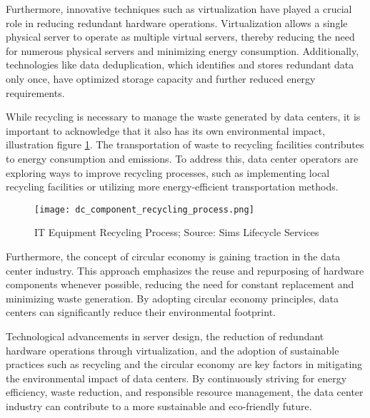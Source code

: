 \documentclass[
  a4paper,  %
  twoside,  %
  bibliography=totoc,
  headsepline,
  cleardoublepage=empty,
  parskip=half,
  draft=false
]{scrbook}
\begin{document}

Furthermore, innovative techniques such as virtualization have played a crucial role in reducing redundant hardware operations\cite{hivenetEWasteCloud}. Virtualization allows a single physical server to operate as multiple virtual servers, thereby reducing the need for numerous physical servers and minimizing energy consumption. Additionally, technologies like data deduplication, which identifies and stores redundant data only once, have optimized storage capacity and further reduced energy requirements.

While recycling is necessary to manage the waste generated by data centers, it is important to acknowledge that it also has its own environmental impact, illustration figure \ref{recycling_lifecycle}. The transportation of waste to recycling facilities contributes to energy consumption and emissions\cite{nor2019energy}. To address this, data center operators are exploring ways to improve recycling processes, such as implementing local recycling facilities or utilizing more energy-efficient transportation methods.

\begin{figure}
	\centering
	\texttt{[image: dc\_component\_recycling\_process.png]}
	\caption{IT Equipment Recycling Process; Source: Sims Lifecycle Services\cite{simslifecycleEquipmentProcessed}}
	\label{recycling_lifecycle}
\end{figure}


Furthermore, the concept of circular economy is gaining traction in the data center industry. This approach emphasizes the reuse and repurposing of hardware components whenever possible, reducing the need for constant replacement and minimizing waste generation. By adopting circular economy principles, data centers can significantly reduce their environmental footprint\cite{datacentremagazineNavigatingAddressing}.

Technological advancements in server design, the reduction of redundant hardware operations through virtualization, and the adoption of sustainable practices such as recycling and the circular economy are key factors in mitigating the environmental impact of data centers. By continuously striving for energy efficiency, waste reduction, and responsible resource management, the data center industry can contribute to a more sustainable and eco-friendly future.
\end{document}
